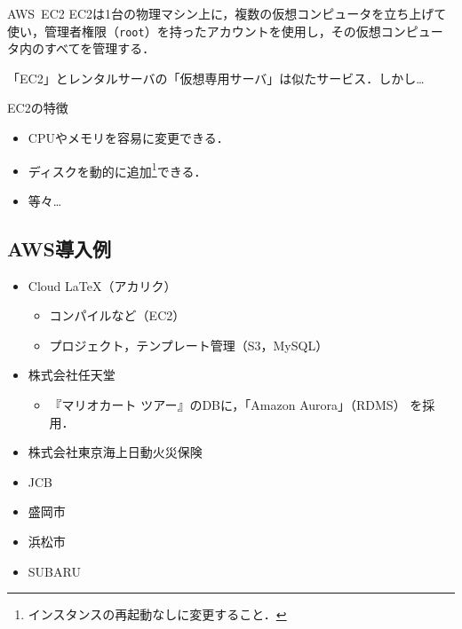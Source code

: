 \begin{frame}[t]{\ftitle}
    \begin{block}{AWS\ EC2}
        EC2は1台の物理マシン上に，複数の仮想コンピュータを立ち上げて使い，管理者権限（\texttt{root}）を持ったアカウントを使用し，その仮想コンピュータ内のすべてを管理する．\hfill\cite{2015amazon}
    \end{block}
    「EC2」とレンタルサーバの「仮想専用サーバ」は似たサービス．しかし\dots
    \begin{exampleblock}{EC2の特徴}
        \begin{itemize}
            \item CPUやメモリを容易に変更できる．\hfill{}
            \item ディスクを動的に追加\footnote{インスタンスの再起動なしに変更すること．}できる．
                  \item[]\hfill 等々\dots
        \end{itemize}
    \end{exampleblock}
\end{frame}
\subsection{AWS導入例}
\begin{frame}[t]{\ftitle}
    \begin{itemize}
        \item Cloud LaTeX（アカリク）
              \begin{itemize}
                  \item コンパイルなど（EC2）
                  \item プロジェクト，テンプレート管理（S3，MySQL）
              \end{itemize}
        \item 株式会社任天堂
              \begin{itemize}
                  \item 『マリオカート ツアー』のDBに，「Amazon Aurora」（RDMS） を採用．
              \end{itemize}
        \item 株式会社東京海上日動火災保険
        \item JCB
        \item 盛岡市
        \item 浜松市
        \item SUBARU
    \end{itemize}
    \hfill\cite{導入事例}
\end{frame}